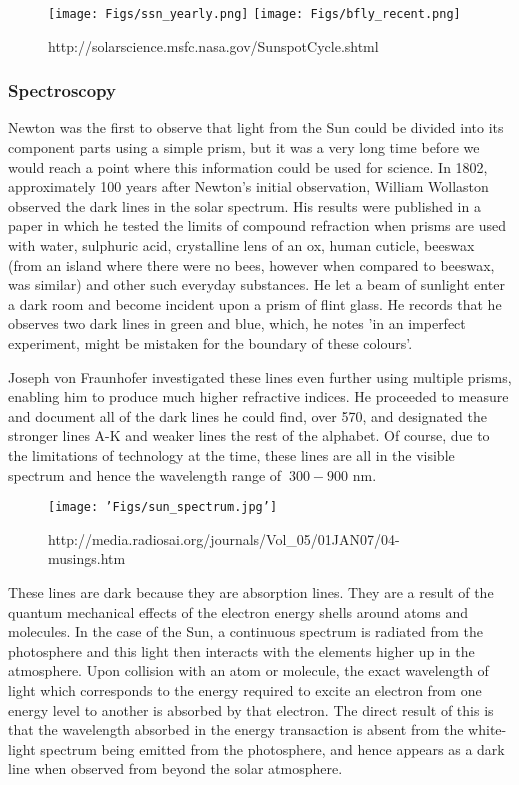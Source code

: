 \begin{figure}
	\texttt{[image: Figs/ssn\_yearly.png]}
	\texttt{[image: Figs/bfly\_recent.png]}
	\caption{http://solarscience.msfc.nasa.gov/SunspotCycle.shtml}
	\label{fig:sunspot_count}
\end{figure}

\subsubsection{Spectroscopy}

Newton was the first to observe that light from the Sun could be divided into its component parts using a simple prism, but it was a very long time before we would reach a point where this information could be used for science.
In 1802, approximately 100 years after Newton's initial observation, William Wollaston observed the dark lines in the solar spectrum.
His results were published in a paper in which he tested the limits of compound refraction when prisms are used with water, sulphuric acid, crystalline lens of an ox, human cuticle, beeswax (from an island where there were no bees, however when compared to beeswax, was similar) and other such everyday substances.
He let a beam of sunlight enter a dark room and become incident upon a prism of flint glass.
He records that he observes two dark lines in green and blue, which, he notes 'in an imperfect experiment, might be mistaken for the boundary of these colours'.

Joseph von Fraunhofer investigated these lines even further using multiple prisms, enabling him to produce much higher refractive indices. 
He proceeded to measure and document all of the dark lines he could find, over 570, and designated the stronger lines A-K and weaker lines the rest of the alphabet.
Of course, due to the limitations of technology at the time, these lines are all in the visible spectrum and hence the wavelength range of $~300 - 900$ nm.

\begin{figure}
	\texttt{[image: 'Figs/sun\_spectrum.jpg']}
	\label{fig:fraunhofer}
	\caption{http://media.radiosai.org/journals/Vol_05/01JAN07/04-musings.htm}
\end{figure}


These lines are dark because they are absorption lines.
They are a result of the quantum mechanical effects of the electron energy shells around atoms and molecules.
In the case of the Sun, a continuous spectrum is radiated from the photosphere and this light then interacts with the elements higher up in the atmosphere.
Upon collision with an atom or molecule, the exact wavelength of light which corresponds to the energy required to excite an electron from one energy level to another is absorbed by that electron.
The direct result of this is that the wavelength absorbed in the energy transaction is absent from the white-light spectrum being emitted from the photosphere, and hence appears as a dark line when observed from beyond the solar atmosphere. 


